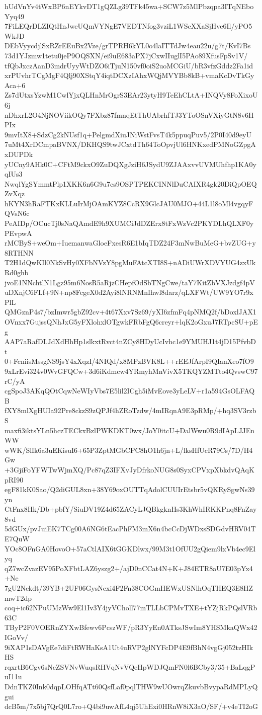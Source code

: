 hUdVnYv4tWxBP6nEYkvDT1gQZLg39TFk45wa+SCW7z5MlPbzqpa3ITqNEboYyq49
7FiLEQrDLZIQtHnJweUQmVYNgE7VEDTNfog3vziL1WScXXaSjHve6Il/yPO5WkJD
DEbVyycdjlSxRZrEEuBx2Vze/grTPRH6kYL0o4laITTdJw4eau22u/g7t/KvI7Bs
73d1YJzmw1tetu0jeP9OQSXN/ei9uE683aPX7jCxwIIuglI5PAo89XfusFpSv1V/
tfQbJxczAanD3mdrUyyWtDZO6iTjuN150vf0oiS2uoMCGiU/bR3vfzGddz2Fa1id
xrPUvhrTCgMgF4Qlj90XStqY4iqtDCXzIAhxWQjMVYBb8kB+vmaKcDvTkGyAca+6
Zs7dUtxsYzwM1CwlYjxQLHnMrOgrS3EAr23ytyH9TeEhCLtA+INQVy8FoXixoU6j
nDhxrL2O4NjNOViikOQy7FXbz87fmnqEtThUAbrhfTJ3YToOSnVXiyGtN8v6HPIx
9mvItX8+SdzCg2kNUsf1q+PelgmdXiuJNiWstFvsT4k5ppuqPuv5/2P0I40d9eyU
7uMt4XrDCmpaBVNX/DKHQS9twJCxtdTh64ToOpvjUl6HNKxedPMNoGZpgAxDUPDk
yUCny9AHk0C+CFtM9ckxO9ZuDQXgJziH6JSydU9ZJAAxvvUVMUhfhp1KA0yqIUs3
NwqlYgSYmmtPlp1XKK6n6G9u7cs9OSPTPEKCINNlDuCAIXR4gk20DiQpOEQZvXqz
hKYN3hRaFTKxKLLuIrMjOAmKYZ8CcRX9GlcJAU0MJO+44L1l8oMl4vgqyFQVsN6c
PeAIDp/OCucTj0sNaQAmdE9h9XUMCiJdDZErx8tFxWzVc2PKYDLhQLXF0yPEvpwA
rMCByS+weOm+IuemanwaGloeFxesR6E1bIqTDZ24F3mNwBuMeG+bvZUG+y8RTHNN
T2H1dQwKIl0NkSvHy0XFbNVzY8pgMuFAtcXTI8S+nADiUWrXDVYUG4zxUkRd0ghb
jvoE1NNchtlN1Lgz95m6NosR5aRjzCHepfOdSbTNgCwe/taY7KitZbVXJzdgf4pV
uDXnjC6FLf+9N+np8FcgeX0d2Ayi8lNRNMnIhwl8darz/qLXFWt/UW9YO7r9xPlL
QMGznP4s7/bzImwr5gbZ92cv+4t67Xxv7Sz69/yXI6zfmFq4pNMQ2f/bDoxlJAX1
OVnxx7GujssQNhJxG5yFXlohxlOTgwkFRbFgQ6creyr+lqK2oGxuJ7RTpcSU+pEg
AAP7aRafDLJdXdHhHp1slkxtRvct4nZCy8HDyUcIvhc1e9YMUHJ1t4jD15PfvbDt
0+FcniisMssgNS9jsY4xXqzI/4NIQd/x8MPzBVK8L++rEEJfArpI9QIanXeo7fO9
9xLrEvi324v0WvGFQCw+3d6iKdmcw4YRmyhMnVivX5TKQYZMTto4QvswC97rC/yA
cgSpoJ3AKqQOtCqwNeWIyVbs7E5lil2ICgh5iMvEove3yLeLV+r1a594GsOLFAQB
fXY8mlXgHUIa92Pre8ckzS9zQPJf4hZRoTzdw/4mIRqnA9E3pRMp/+hq3SV3rzbS
maxfi3iktsYLn5hczTECkxBzlPWKDKT0wx/JoY0itcU+DalWwu0R9dIApLJJEnWW
wWK/SlIk6a3uEKisuI6+65P3ZptMGbCPC8hO1h6jn+L/lksHfUcR79Cs/7D/H4Gw
+3GjiFoYFWTwWjmXQ/Pc87qZ3IFXvJyDfrkoNUG8s0SyxCPVxpXbkdvQAqKpRI90
egF81kK0Sao/Q2diGUL8xn+38Y69oxOUTTqAdolCUUIrEtsbr5vQKRySgwNs39yn
CtFnx8Hk/Db+pbfY/SiuDV19Z4d65ZACyLJQBkgknHs3KhWhIRKKPnq8FnZay8vd
5dGUx/pvJuiEK7TCg00A6NG6tEacPhFM3mX6n4bcCcDjWDxsSDGdvHRV04TE7QuW
YOc8OFnGA0HovoO+57aCtlAIX6tGGKDlwx/99M3t1OfUU2gQiem9lxVb4ec9Elyq
qZ7wcZvazEV95PoXFbtLAZ6yszg2+/ajD0nCCat4N+K+J84ETR8aU7E03pYx4+Ne
7gU2Nckdt/39YB+2UF06GysNexi4F2Fn38COGmHEWxUSNlhOqTHEQ3E8HZmwT2dp
coq+ic62NPuUMzWw9El1Iv3Y4jyVCholl77mTLLbCPMvTXE+tYZjRkPQslVRb63C
TByP2F0VOERnZYXwBfewv6PcszWF/pR3YyEn0ATksJSwIm8YHSMkaQWx42IGoVv/
9iXAP1sDAVgEe7diFtRWHaKsA1Ut4uRVP2glNYFcDP4E9fBhN4vgGj052tzHIkHS
rqxrtB6Cgv6sNcZSVNvWuqsRHVqNvVQeHpWDJQmFN0l6BCby3/35+BaLqgPuI11u
DdnTKZ0Ink0dqpLOHfqATt60QsfLaf0pqlTHW9wUOwrqZkuvbBvypaRdMPLyQgui
dcB5m/7x5bj7QrQ0L7ro+Q4bi9uwAfL4qj5UhExi0HRnW8iX3aO/SF/+v4eTI2oG
